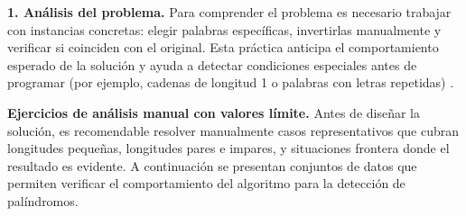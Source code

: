 \documentclass[12pt,twoside]{book}
\begin{document}
						\noindent
						\textbf{1. Análisis del problema.} Para comprender el problema es necesario trabajar con instancias concretas: elegir palabras específicas, invertirlas manualmente y verificar si coinciden con el original. Esta práctica anticipa el comportamiento esperado de la solución y ayuda a detectar condiciones especiales antes de programar (por ejemplo, cadenas de longitud 1 o palabras con letras repetidas) \cite{Gaddis2022Starting,Farrell2018Programming}.
						
						\noindent
						\textbf{Ejercicios de análisis manual con valores límite.}
						Antes de diseñar la solución, es recomendable resolver manualmente casos representativos que cubran longitudes pequeñas, longitudes pares e impares, y situaciones frontera donde el resultado es evidente. A continuación se presentan conjuntos de datos que permiten verificar el comportamiento del algoritmo para la detección de palíndromos.
						
\end{document}
